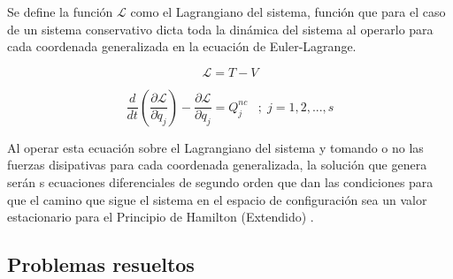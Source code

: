 \documentclass[/home/hernan/Documentos/Apuntes_mecanica_teorica/main.tex]{subfiles}
\begin{document}
    \begin{definition}
        Se define la función $\mathcal{L}$ como el Lagrangiano del sistema, función que para el caso de un sistema conservativo dicta toda la dinámica del sistema al operarlo para cada coordenada generalizada en la ecuación de Euler-Lagrange.

        \begin{equation}
            \mathcal{L} = T - V
            \label{eq: Lagrangiano}
        \end{equation}
        
    \end{definition}

    \begin{definition} 
        
        \begin{equation}
            \frac{d}{d t} \left(\frac{\partial \mathcal{L} }{\partial \dot{q}_{j}} \right) - \frac{\partial \mathcal{L}}{\partial q_{j}} =  Q_{j}^{nc} \; \; \; ; \; j=1,2,...,s
            \label{eq: eqlagrange}
        \end{equation}

        Al operar esta ecuación sobre el Lagrangiano del sistema y tomando o no las fuerzas disipativas para cada coordenada generalizada, la solución que genera serán s ecuaciones diferenciales de segundo orden que dan las condiciones para que el camino que sigue el sistema en el espacio de configuración sea un valor estacionario para el Principio de Hamilton (Extendido) .
        
    \end{definition}


    \subsection{Problemas resueltos}
    
\end{document}
